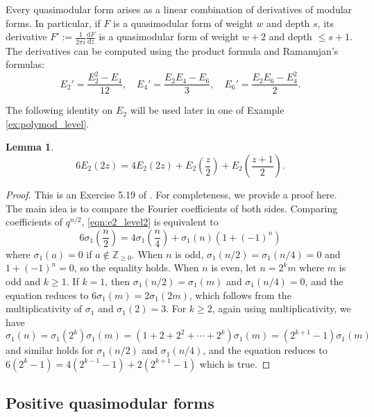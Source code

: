 \documentclass[10pt,reqno]{amsproc}
\newcommand{\dd}{\mathrm{d}}
\newcommand{\bZ}{\mathbb{Z}}
\newcommand{\1}{\mathds{1}}	%
\theoremstyle{definition}
\newtheorem{lemma}[theorem]{Lemma}
\theoremstyle{remark}
\begin{document}
Every quasimodular form arises as a linear combination of derivatives of modular forms.
In particular, if $F$ is a quasimodular form of weight $w$ and depth $s$, its derivative $F' := \frac{1}{2\pi i} \frac{\dd F}{\dd z}$ is a quasimodular form of weight $w + 2$ and depth $\le s + 1$.
The derivatives can be computed using the product formula and Ramanujan's formulas:
\begin{equation}
    \label{eqn:ramanujan}
    E_2' = \frac{E_2^2 - E_4}{12}, \quad E_4' = \frac{E_2 E_4 - E_6}{3}, \quad E_6' = \frac{E_2 E_6 - E_4^2}{2}.
\end{equation}

The following identity on $E_2$ will be used later in one of Example \ref{ex:polymod_level}.
\begin{lemma}
    \begin{equation}
    6E_2(2z) = 4 E_2(2z) + E_2\left(\frac{z}{2}\right) + E_2\left(\frac{z+1}{2}\right). \label{eqn:e2_level2}
    \end{equation}
\end{lemma}
\begin{proof}
    This is an Exercise 5.19 of \cite{romik2023topics}.
    For completeness, we provide a proof here. The main idea is to compare the Fourier coefficients of both sides. Comparing coefficients of $q^{n/2}$, \eqref{eqn:e2_level2} is equivalent to
    \[
    6 \sigma_1\left(\frac{n}{2}\right) = 4 \sigma_1\left(\frac{n}{4}\right) + \sigma_1(n) (1 + (-1)^n)
    \]
    where $\sigma_1(a) = 0$ if $a \notin \bZ_{\ge 0}$.
    When $n$ is odd, $\sigma_1(n/2) = \sigma_1(n/4) = 0$ and $1 + (-1)^n = 0$, so the equality holds.
    When $n$ is even, let $n = 2^k m$ where $m$ is odd and $k \ge 1$.
    If $k = 1$, then $\sigma_1(n/2) = \sigma_1(m)$ and $\sigma_1(n/4) = 0$, and the equation reduces to $6 \sigma_1(m) = 2 \sigma_1(2m)$, which follows from the multiplicativity of $\sigma_1$ and $\sigma_1(2) = 3$.
    For $k \ge 2$, again using multiplicativity, we have
    \[
    \sigma_1(n) = \sigma_1(2^k) \sigma_1(m) = (1 + 2 + 2^2 + \cdots + 2^k) \sigma_1(m) = (2^{k+1} - 1) \sigma_1(m)
    \]
    and similar holds for $\sigma_1(n/2)$ and $\sigma_1(n/4)$, and the equation reduces to $6(2^k - 1) = 4(2^{k-1} - 1) + 2(2^{k+1} - 1)$ which is true.
\end{proof}


\subsection{Positive quasimodular forms}
\label{subsec:prelim_posqmf}
\end{document}
